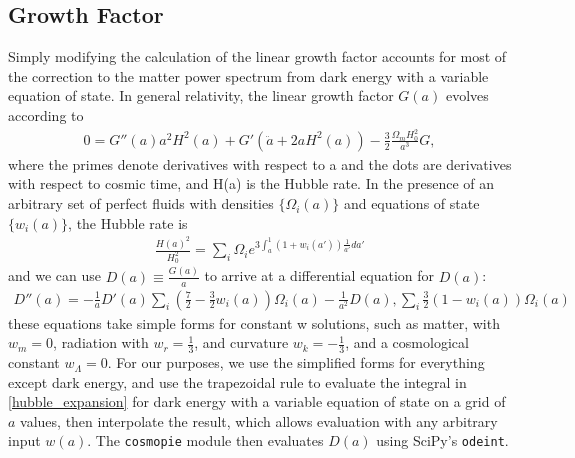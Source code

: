 \documentclass[a4paper,11pt]{article}
\begin{document}
\subsection{Growth Factor}
\label{ssec:growth_factor}
Simply modifying the calculation of the linear growth factor accounts for most of the correction to the matter power spectrum from dark energy with a variable equation of state. In general relativity, the linear growth factor $G(a)$ evolves according to\cite{weinberg_probes} 
\begin{align}\label{growth_time}
0=G''(a)a^2 H^2(a)+G'\left(\ddot{a}+2a H^2(a)\right)-\frac{3}{2}\frac{\Omega_m H_0^2}{a^3}G,
\end{align}
where the primes denote derivatives with respect to a and the dots are derivatives with respect to cosmic time, and H(a) is the Hubble rate. In the presence of an arbitrary set of perfect fluids with densities $\{\Omega_i(a)\}$ and equations of state $\{w_i(a)\}$, the Hubble rate is
\begin{align}\label{hubble_expansion}
\frac{H(a)^2}{H_0^2}=\sum_i{\Omega_i e^{3\int_a^1(1+w_i(a'))\frac{1}{a'}da'}}
\end{align}
and we can use $D(a)\equiv\frac{G(a)}{a}$ to arrive at a differential equation for $D(a)$:
\begin{align}\label{growth_diff}
D''(a)=-\frac{1}{a}D'(a)\sum_i{\left(\frac{7}{2}-\frac{3}{2}w_i(a)\right)\Omega_i(a)}-\frac{1}{a^2}D(a),\sum_i{\frac{3}{2}\left(1-w_i(a)\right)\Omega_i(a)}
\end{align}
these equations take simple forms for constant w solutions, such as matter, with $w_m=0$, radiation with $w_r=\frac{1}{3}$, and curvature $w_k=-\frac{1}{3}$, and a cosmological constant $w_\Lambda=0$. For our purposes, we use the simplified forms for everything except dark energy, and use the trapezoidal rule to evaluate the integral in \eqref{hubble_expansion} for dark energy with a variable equation of state on a grid of $a$ values, then interpolate the result, which allows evaluation with any arbitrary input $w(a)$. The \texttt{cosmopie} module then evaluates $D(a)$ using SciPy's \texttt{odeint}. 
\end{document}
